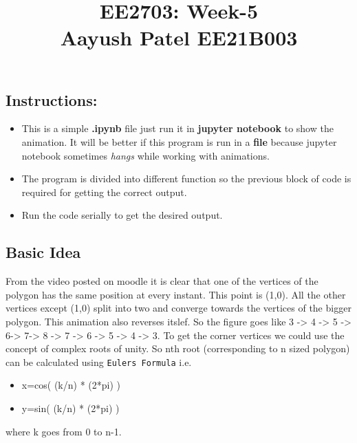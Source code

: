 \documentclass[11pt]{article}
\title{EE2703: Week-5 \\
    Aayush Patel EE21B003}
\providecommand{\tightlist}{%
      \setlength{\itemsep}{0pt}\setlength{\parskip}{0pt}}
\begin{document}
    
    \maketitle
    
    

    
    \hypertarget{instructions}{%
\subsection{Instructions:}\label{instructions}}

\begin{itemize}
\tightlist
\item
  This is a simple \textbf{.ipynb} file just run it in \textbf{jupyter
  notebook} to show the animation. It will be better if this program is
  run in a \textbf{file} because jupyter notebook sometimes \emph{hangs}
  while working with animations.
\item
  The program is divided into different function so the previous block
  of code is required for getting the correct output.
\item
  Run the code serially to get the desired output.
\end{itemize}

    \hypertarget{basic-idea}{%
\subsection{Basic Idea}\label{basic-idea}}

From the video posted on moodle it is clear that one of the vertices of
the polygon has the same position at every instant. This point is (1,0).
All the other vertices except (1,0) split into two and converge towards
the vertices of the bigger polygon.
\newline
This animation also reverses itslef.
So the figure goes like 3 -\textgreater{} 4 -\textgreater{} 5
-\textgreater{} 6-\textgreater{} 7-\textgreater{} 8 -\textgreater{} 7
-\textgreater{} 6 -\textgreater{} 5 -\textgreater{} 4 -\textgreater{} 3.
To get the corner vertices we could use the concept of complex roots of
unity. So nth root (corresponding to n sized polygon) can be calculated
using \texttt{Euler\textquotesingle{}s\ Formula} i.e. 
\begin{itemize}
    \item x=cos( (k/n) * (2*pi) )
    \item y=sin( (k/n) * (2*pi) )
\end{itemize}
where k goes from 0 to n-1.
\end{document}
